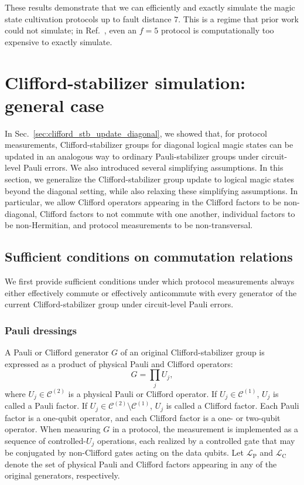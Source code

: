 \documentclass[
 reprint,
 amsmath,amssymb,
 pra,superscriptaddress, nofootinbib
]{revtex4-2}
\theoremstyle{definition}
\theoremstyle{plain}
\newcommand{\cC}{\mathcal C}
\begin{document}
These results demonstrate that we can efficiently and exactly simulate the magic state cultivation protocols up to fault distance $7$.
This is a regime that prior work could not simulate; in Ref.~\cite{gpvl-lg4c}, even an $f=5$ protocol is computationally too expensive to exactly simulate.

\section{Clifford-stabilizer simulation:  general case}\label{sec:clifford_stb_update}
In Sec.~\ref{sec:clifford_stb_update_diagonal}, we showed that, for protocol measurements, Clifford-stabilizer groups for diagonal logical magic states can be updated in an analogous way to ordinary Pauli-stabilizer groups under circuit-level Pauli errors. 
We also introduced several simplifying assumptions. In this section, we generalize the Clifford-stabilizer group update to logical magic states beyond the diagonal setting, while also relaxing these simplifying assumptions. 
In particular, we allow Clifford operators appearing in the Clifford factors to be non-diagonal, Clifford factors to not commute with one another, individual factors to be non-Hermitian, and protocol measurements to be non-transversal.

\subsection{Sufficient conditions on commutation relations}
We first provide sufficient conditions under which protocol measurements always either effectively commute or effectively anticommute with every generator of the current Clifford-stabilizer group under circuit-level Pauli errors.

\subsubsection{Pauli dressings}
\label{subsubsec:commutation}

A Pauli or Clifford generator $G$ of an original Clifford-stabilizer group is expressed as a product of physical Pauli and Clifford operators:
\begin{equation}
  \label{eq:factor}
  G = \prod_j U_j,
\end{equation}
where $U_j \in \cC^{(2)}$ is a physical Pauli or Clifford operator.
If $U_j \in\cC^{(1)}$, $U_j$ is called a Pauli factor. If $U_j \in \cC^{(2)} \setminus \cC^{(1)}$, $U_j$ is called a Clifford factor.
Each Pauli factor is a one-qubit operator, and each Clifford factor is a one- or two-qubit operator.
When measuring $G$ in a protocol, the measurement is implemented as a sequence of controlled-$U_j$ operations, each realized by a controlled gate that may be conjugated by non-Clifford gates acting on the data qubits.
Let $\mathcal L_{\mathrm{P}}$ and $\mathcal L_{\mathrm{C}}$ denote the set of physical Pauli and Clifford factors appearing in any of the original generators, respectively. 
\end{document}
